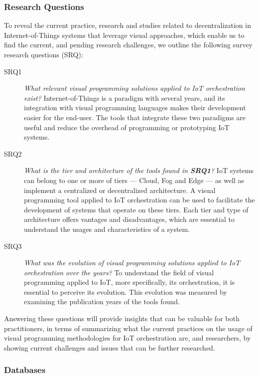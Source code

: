 \subsubsection{Research Questions}\label{sec:slr_research_questions}

To reveal the current practice, research and studies related to decentralization in Internet-of-Things systems that leverage visual approaches, which enable us to find the current, and pending research challenges, we outline the following survey research questions (SRQ):

\begin{description}
    \item[SRQ1] \textit{What relevant visual programming solutions applied to IoT orchestration exist?} Internet-of-Things is a paradigm with several years, and its integration with visual programming languages makes their development easier for the end-user. The tools that integrate these two paradigms are useful and reduce the overhead of programming or prototyping IoT systems.
    \item[SRQ2] \textit{What is the tier and architecture of the tools found in \textbf{SRQ1}?} IoT systems can belong to one or more of tiers --- Cloud, Fog and Edge --- as well as implement a centralized or decentralized architecture. A visual programming tool applied to IoT orchestration can be used to facilitate the development of systems that operate on these tiers. Each tier and type of architecture offers vantages and disadvantages, which are essential to understand the usages and characteristics of a system.
    \item[SRQ3] \textit{What was the evolution of visual programming solutions applied to IoT orchestration over the years?} To understand the field of visual programming applied to IoT, more specifically, its orchestration, it is essential to perceive its evolution. This evolution was measured by examining the publication years of the tools found.
\end{description}

Answering these questions will provide insights that can be valuable for both practitioners, in terms of summarizing what the current practices on the usage of visual programming methodologies for IoT orchestration are, and researchers, by showing current challenges and issues that can be further researched.

\subsubsection{Databases}\label{sec:databases}

